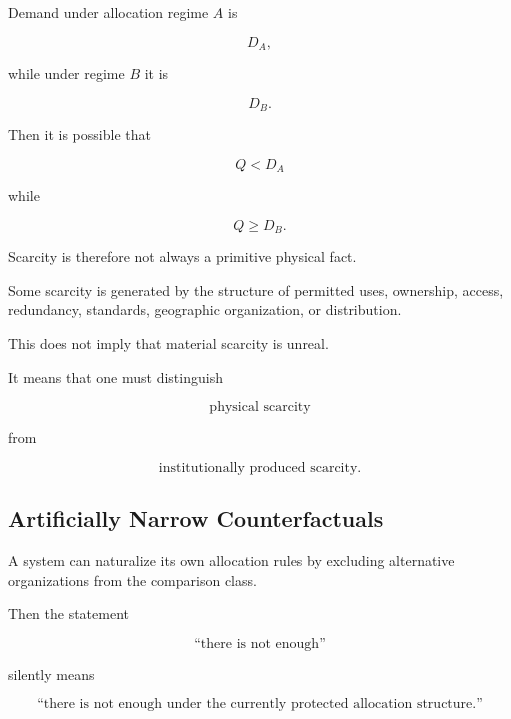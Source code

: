 \documentclass[11pt]{article}
\theoremstyle{remark}
\begin{document}
Demand under allocation regime $A$ is

\begin{equation}
D_A,
\end{equation}

while under regime $B$ it is

\begin{equation}
D_B.
\end{equation}

Then it is possible that

\begin{equation}
Q<D_A
\end{equation}

while

\begin{equation}
Q\geq D_B.
\end{equation}

Scarcity is therefore not always a primitive physical fact.

Some scarcity is generated by the structure of permitted uses, ownership, access, redundancy, standards, geographic organization, or distribution.

This does not imply that material scarcity is unreal.

It means that one must distinguish

\begin{equation}
\text{physical scarcity}
\end{equation}

from

\begin{equation}
\text{institutionally produced scarcity}.
\end{equation}

\subsection{Artificially Narrow Counterfactuals}

A system can naturalize its own allocation rules by excluding alternative organizations from the comparison class.

Then the statement

\begin{equation}
\text{``there is not enough''}
\end{equation}

silently means

\begin{equation}
\text{``there is not enough under the currently protected allocation structure.''}
\end{equation}
\end{document}
